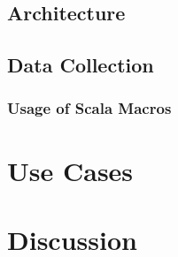 \section{Architecture}

\section{Data Collection}

\subsection{Usage of Scala Macros}

\chapter{Use Cases}
\label{ch:use_cases}

\chapter{Discussion}
\label{ch:discussion}